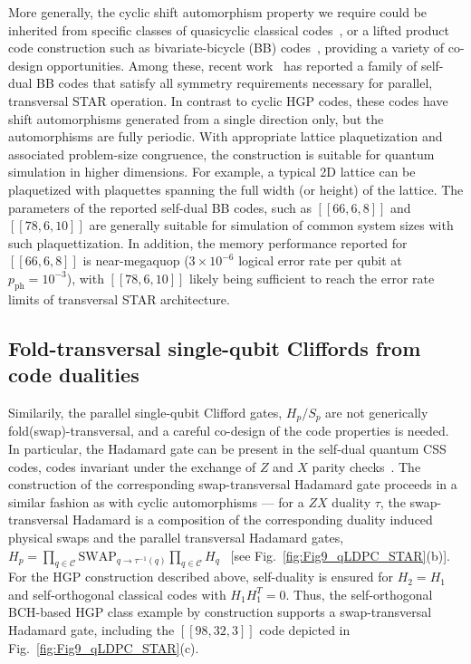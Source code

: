 \documentclass[aps, prx, reprint, superscriptaddress, longbibliography, floatfix]{revtex4-2}
\begin{document}
More generally, the cyclic shift automorphism property we require could be inherited from specific classes of quasicyclic classical codes~\cite{Xu2025}, or a lifted product code construction such as bivariate-bicycle (BB) codes~\cite{Bravyi2024, eberhardt2024}, providing a variety of co-design opportunities.  Among these, recent work~\cite{Xu2025batched} has reported a family of self-dual BB codes that satisfy all symmetry requirements necessary for parallel, transversal STAR operation. In contrast to cyclic HGP codes, these codes have shift automorphisms generated from a single direction only, but the automorphisms are fully periodic. With appropriate lattice plaquetization and associated problem-size congruence, the construction is suitable for quantum simulation in higher dimensions. For example, a typical 2D lattice can be plaquetized with plaquettes spanning the full width (or height) of the lattice. The parameters of the reported self-dual BB codes, such as $[[66,6,8]]$ and $[[78,6,10]]$ are generally suitable for simulation of common system sizes with such plaquettization. In addition, the memory performance reported for $[[66,6,8]]$ is near-megaquop ($3 \times 10^{-6}$ logical error rate per qubit at $p_{\mathrm{ph}}=10^{-3}$), with $[[78,6,10]]$ likely being sufficient to reach the error rate limits of transversal STAR architecture.

\subsection{Fold-transversal single-qubit Cliffords from code dualities}
\label{sec:qldpc_h}

Similarily, the parallel single-qubit Clifford gates, $H_p/S_p$ are not generically fold(swap)-transversal, and a careful co-design of the code properties is needed. In particular, the Hadamard gate can be present in the self-dual quantum CSS codes, codes invariant under the exchange of $Z$ and $X$ parity checks~\cite{eberhardt2024, Breuckmann2024}. The construction of the corresponding swap-transversal Hadamard gate proceeds in a similar fashion as with cyclic automorphisms --- for a $ZX$ duality $\tau$, the swap-transversal Hadamard is a composition of the corresponding duality induced physical swaps and the parallel transversal Hadamard gates, $H_p=\prod_{q \in \mathcal{C}} \textrm{SWAP}_{q \rightarrow \tau^{-1}(q) }\prod_{q \in \mathcal{C}}{H_q}$~\cite{eberhardt2024, Breuckmann2024} [see Fig.~\ref{fig:Fig9_qLDPC_STAR}(b)]. For the HGP construction described above, self-duality is ensured for $H_2=H_1$ and self-orthogonal classical codes with $H_1H_1^T=0$. Thus, the self-orthogonal BCH-based HGP class example by construction supports a swap-transversal Hadamard gate, including the $[[98,32,3]]$ code depicted in Fig.~\ref{fig:Fig9_qLDPC_STAR}(c). 
\end{document}
